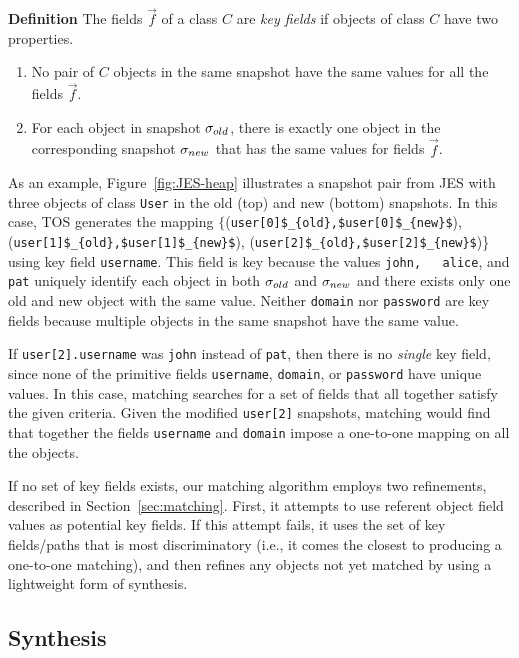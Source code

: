 \documentclass[natbib,10pt]{sigplanconf}
\newcommand{\code}[1]{\lstinline|#1|\xspace}
\newcommand{\TOS}{TOS\xspace}
\begin{document}
\noindent \textbf{Definition} The fields $\vec{f}$ of a class $C$ are
\emph{key fields} if objects of class $C$ have two properties.
\vspace*{-1ex}
\begin{enumerate}
\item No pair of $C$ objects in the same snapshot have the same values
  for all the fields $\vec{f}$.
\item For each object in snapshot $\sigma_{old}$, there is exactly one
  object in the corresponding snapshot $\sigma_{new}$ that has the same
  values for fields $\vec{f}$.
\end{enumerate}

\noindent
As an example, Figure~\ref{fig:JES-heap} illustrates a snapshot pair
from JES with three objects of class \code{User} in the old (top) and
new (bottom) snapshots.  In this case, \TOS generates the mapping
$\{$(\code{user[0]$_{old},$}\code{user[0]$_{new}$}),
(\code{user[1]$_{old},$}\code{user[1]$_{new}$}),
(\code{user[2]$_{old},$}\code{user[2]$_{new}$})\} using key field
\code{username}.  This field is key because the values \code{john,
  alice}, and \code{pat} uniquely identify each object in both
$\sigma_{old}$ and $\sigma_{new}$ and there exists only one old and new
object with the same value. Neither \code{domain} nor \code{password}
are key fields because multiple objects in the same snapshot have the
same value.

If \code{user[2].username} was \code{john} instead of
\code{pat}, then there is no \emph{single} key field, since
none of the primitive fields \code{username}, \code{domain}, or
\code{password} have unique values.  In this case, matching searches
for a set of fields that all together satisfy the given
criteria. Given the modified \code{user[2]} snapshots, matching would find
that together the fields \code{username} and \code{domain} impose a
one-to-one mapping on all the objects.

If no set of key fields exists, our matching algorithm employs two
refinements, described in Section~\ref{sec:matching}.  First, it attempts to use referent object field values
as potential key fields.  If this attempt fails, it uses the set of key
fields/paths that is most discriminatory (i.e., it comes the closest
to producing a one-to-one matching), and then refines any objects not
yet matched by using a lightweight form of synthesis.

\subsection{Synthesis}
\end{document}
